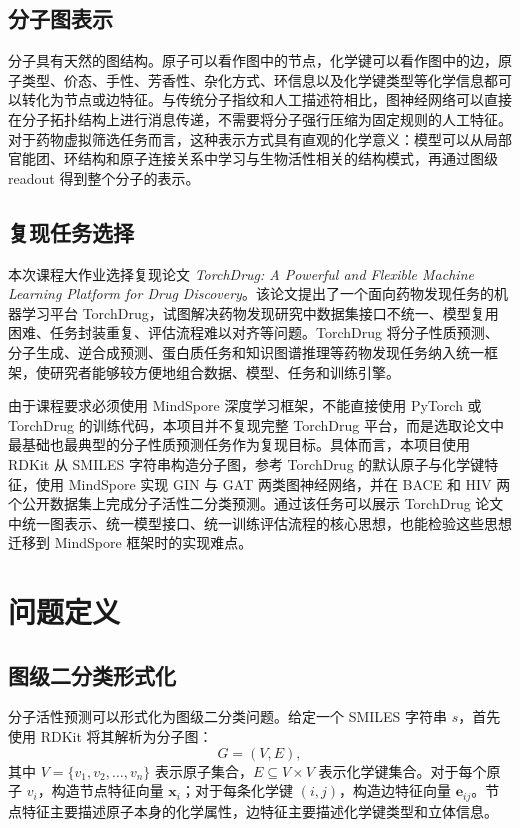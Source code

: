 \documentclass[12pt,hyperref,a4paper,UTF8]{ctexart}
\begin{document}
\subsection{分子图表示}

分子具有天然的图结构。原子可以看作图中的节点，化学键可以看作图中的边，原子类型、价态、手性、芳香性、杂化方式、环信息以及化学键类型等化学信息都可以转化为节点或边特征。与传统分子指纹和人工描述符相比，图神经网络可以直接在分子拓扑结构上进行消息传递，不需要将分子强行压缩为固定规则的人工特征。对于药物虚拟筛选任务而言，这种表示方式具有直观的化学意义：模型可以从局部官能团、环结构和原子连接关系中学习与生物活性相关的结构模式，再通过图级 readout 得到整个分子的表示。

\subsection{复现任务选择}

本次课程大作业选择复现论文 \emph{TorchDrug: A Powerful and Flexible Machine Learning Platform for Drug Discovery}\cite{torchdrug}。该论文提出了一个面向药物发现任务的机器学习平台 TorchDrug，试图解决药物发现研究中数据集接口不统一、模型复用困难、任务封装重复、评估流程难以对齐等问题。TorchDrug 将分子性质预测、分子生成、逆合成预测、蛋白质任务和知识图谱推理等药物发现任务纳入统一框架，使研究者能够较方便地组合数据、模型、任务和训练引擎。

由于课程要求必须使用 MindSpore 深度学习框架，不能直接使用 PyTorch 或 TorchDrug 的训练代码，本项目并不复现完整 TorchDrug 平台，而是选取论文中最基础也最典型的分子性质预测任务作为复现目标。具体而言，本项目使用 RDKit 从 SMILES 字符串构造分子图，参考 TorchDrug 的默认原子与化学键特征，使用 MindSpore 实现 GIN 与 GAT 两类图神经网络，并在 BACE 和 HIV 两个公开数据集上完成分子活性二分类预测。通过该任务可以展示 TorchDrug 论文中统一图表示、统一模型接口、统一训练评估流程的核心思想，也能检验这些思想迁移到 MindSpore 框架时的实现难点。

\section{问题定义}

\subsection{图级二分类形式化}

分子活性预测可以形式化为图级二分类问题。给定一个 SMILES 字符串 $s$，首先使用 RDKit 将其解析为分子图：
\[
G=(V,E),
\]
其中 $V=\{v_1,v_2,\ldots,v_n\}$ 表示原子集合，$E\subseteq V\times V$ 表示化学键集合。对于每个原子 $v_i$，构造节点特征向量 $\mathbf{x}_i$；对于每条化学键 $(i,j)$，构造边特征向量 $\mathbf{e}_{ij}$。节点特征主要描述原子本身的化学属性，边特征主要描述化学键类型和立体信息。
\end{document}
